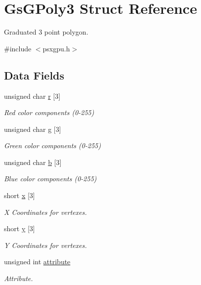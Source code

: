 \hypertarget{structGsGPoly3}{}\section{Gs\+G\+Poly3 Struct Reference}
\label{structGsGPoly3}


Graduated 3 point polygon.  




{\ttfamily \#include $<$psxgpu.\+h$>$}

\subsection*{Data Fields}
\begin{DoxyCompactItemize}
\item 
unsigned char \hyperlink{structGsGPoly3_a9d8181d4a7c066a57d9f38a76f04284b}{r} \mbox{[}3\mbox{]}
\begin{DoxyCompactList}\small\item\em Red color components (0-\/255) \end{DoxyCompactList}\item 
unsigned char \hyperlink{structGsGPoly3_ac2480a7e16ac62b8560faa7b5c8fc69b}{g} \mbox{[}3\mbox{]}
\begin{DoxyCompactList}\small\item\em Green color components (0-\/255) \end{DoxyCompactList}\item 
unsigned char \hyperlink{structGsGPoly3_ab14e694e5e825fc17a3bdec4e54dae59}{b} \mbox{[}3\mbox{]}
\begin{DoxyCompactList}\small\item\em Blue color components (0-\/255) \end{DoxyCompactList}\item 
short \hyperlink{structGsGPoly3_aa88c14cf01a721462df4032ea1daa1b6}{x} \mbox{[}3\mbox{]}
\begin{DoxyCompactList}\small\item\em X Coordinates for vertexes. \end{DoxyCompactList}\item 
short \hyperlink{structGsGPoly3_aff8727e5b3a6d62fd51e0e62a214fb58}{y} \mbox{[}3\mbox{]}
\begin{DoxyCompactList}\small\item\em Y Coordinates for vertexes. \end{DoxyCompactList}\item 
unsigned int \hyperlink{structGsGPoly3_a3c8f401c79e4238327f6068479de9c48}{attribute}
\begin{DoxyCompactList}\small\item\em Attribute. \end{DoxyCompactList}\end{DoxyCompactItemize}


